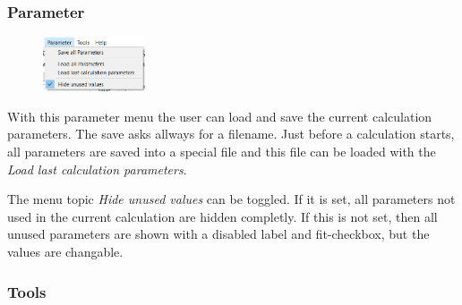 \documentclass[11pt]{article} %
\begin{document}
\subsubsection{Parameter}

\begin{figure}
  \begin{center}
    \includegraphics[width=0.27\textwidth]{menu-parameter.png}
  \end{center}
\end{figure}
With this parameter menu the user can load and save the current calculation parameters. The save asks allways for a filename. Just before a calculation starts, all parameters are saved into a special file and this file can be loaded with the {\it Load last calculation parameters}.

The menu topic {\it Hide unused values} can be toggled. If it is set, all parameters not used in the current calculation are hidden completly. If this is not set, then all unused parameters are shown with a disabled label and fit-checkbox, but the values are changable.
\\

\subsubsection{Tools}
\end{document}
